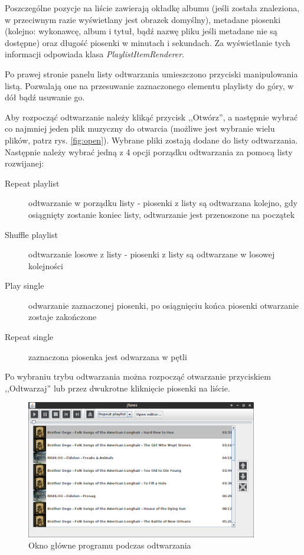 \documentclass[12pt,a4paper,notitlepage]{article}
\begin{document}
Poszczególne pozycje na liście zawierają okładkę albumu (jeśli została znaleziona, w przeciwnym razie wyświetlany jest obrazek domyślny), metadane piosenki (kolejno: wykonawcę, 
album i tytuł, bądź nazwę pliku jeśli metadane nie są dostępne) oraz długość piosenki w minutach i sekundach. Za wyświetlanie tych informacji odpowiada klasa \emph{PlaylistItemRenderer}.

Po prawej stronie panelu listy odtwarzania umieszczono przyciski manipulowania listą. Pozwalają one na przesuwanie zaznaczonego elementu playlisty do góry, w dół bądź usuwanie go.

Aby rozpocząć odtwarzanie należy klikąć przycisk ,,Otwórz'', a następnie wybrać co najmniej jeden plik muzyczny do otwarcia (możliwe jest wybranie wielu plików, patrz rys. \ref{fig:open}).
Wybrane pliki zostają dodane do listy odtwarzania. Następnie należy wybrać jedną z 4 opcji porządku odtwarzania za pomocą listy rozwijanej:
\begin{description}
 \item[Repeat playlist] odtwarzanie w porządku listy - piosenki z listy są odtwarzana kolejno, gdy osiągnięty zostanie koniec listy, odtwarzanie jest przenoszone na początek
 \item[Shuffle playlist] odtwarzanie losowe z listy - piosenki z listy są odtwarzane w losowej kolejności
 \item[Play single] odwarzanie zaznaczonej piosenki, po osiągnięciu końca piosenki otwarzanie zostaje zakończone
 \item[Repeat single] zaznaczona piosenka jest odwarzana w pętli
\end{description}
Po wybraniu trybu odtwarzania można rozpocząć otwarzanie przyciskiem ,,Odtwarzaj'' lub przez dwukrotne kliknięcie piosenki na liście.

\begin{figure}[hb]
 \centering
 \includegraphics[width=0.9\textwidth]{img/player_playing.png}
 \caption{Okno główne programu podczas odtwarzania}
 \label{fig:player_playing}
\end{figure}
\end{document}
